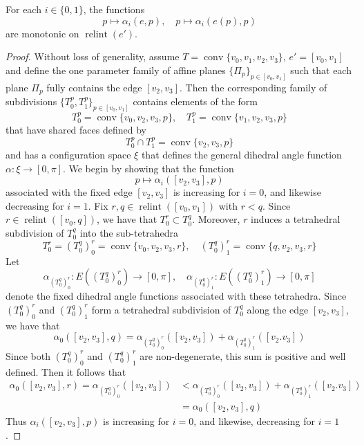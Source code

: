 \documentclass{mainresearch}
\begin{document}
\begin{lemma}
	For each $i \in \{0,1\}$, the functions 
	\begin{equation*}
		p \longmapsto \alpha_i(e,p), \quad p \longmapsto \alpha_i(e(p),p)
	\end{equation*}
	are monotonic on $\operatorname{relint}(e')$.
\end{lemma}
\begin{proof}
	Without loss of generality, assume $T = \operatorname{conv}\{v_0,v_1,v_2,v_3\}$, $e' = [v_0,v_1]$ and define the one parameter family of affine planes $\{\Pi_p\}_{p \in [v_0,v_1]}$ such that each plane $\Pi_p$ fully contains the edge $[v_2,v_3]$. Then the corresponding family of subdivisions $\{T_0^p,T_1^p\}_{p \in [v_0,v_1]}$ contains elements of the form
	\begin{equation*}
		T_0^p = \operatorname{conv} \{v_0,v_2,v_3,p\}, \quad T_1^p = \operatorname{conv} \{v_1,v_2,v_3,p\}
	\end{equation*}
	that have shared faces defined by
	\begin{equation*}
		T_0^p \cap T_1^p = \operatorname{conv}\{v_2,v_3,p\}    
	\end{equation*}
	and has a configuration space $\xi$ that defines the general dihedral angle function $\alpha: \xi \to [0,\pi]$. We begin by showing that the function 
	\begin{equation*}
		p \longmapsto \alpha_i([v_2,v_3],p)
	\end{equation*}
	associated with the fixed edge $[v_2,v_3]$ is increasing for $i=0$, and likewise decreasing for $i=1$. Fix $r,q\in \operatorname{relint}([v_0,v_1])$ with $r<q$. Since $r \in \operatorname{relint}([v_0,q])$, we have that $T_0^r \subset T_0^q$. Moreover, $r$ induces a tetrahedral subdivision of $T_0^q$ into the sub-tetrahedra
	\begin{equation*}
		T_0^r= (T_0^q)^r_0 = \operatorname{conv}\{v_0,v_2,v_3,r\}, \quad (T_0^q)^r_1 = \operatorname{conv}\{q,v_2,v_3,r\}
	\end{equation*}
	Let
	\begin{equation*}
		\alpha_{(T_0^q)^r_0}: E((T_0^q)^r_0) \to [0,\pi], \quad \alpha_{(T_0^q)^r_1}: E((T_0^q)^r_1) \to [0,\pi]
	\end{equation*}
	denote the fixed dihedral angle functions associated with these tetrahedra. Since $(T_0^q)^r_0$ and $(T_0^q)^r_1$ form a tetrahedral subdivision of $T_0^q$ along the edge $[v_2,v_3]$, we have that
	\begin{equation*}
		\alpha_0([v_2,v_3],q) = \alpha_{(T_0^q)^r_0}([v_2,v_3])+\alpha_{(T_0^q)^r_1}([v_2.v_3])
	\end{equation*}
	Since both $(T_0^q)^r_0$ and $(T_0^q)^r_1$ are non-degenerate, this sum is positive and well defined. Then it follows that
	\begin{align*}
		\alpha_0([v_2,v_3],r) = \alpha_{(T_0^q)^r_0}([v_2,v_3]) &< \alpha_{(T_0^q)^r_0}([v_2,v_3])+\alpha_{(T_0^q)^r_1}([v_2.v_3]) \\
		&= \alpha_{0}([v_2,v_3],q)
	\end{align*}
	Thus $\alpha_i([v_2,v_3],p)$ is increasing for $i=0$, and likewise, decreasing for $i=1$. 
	

\end{proof}
\end{document}

